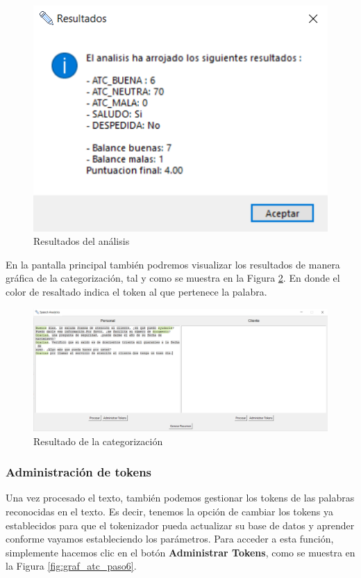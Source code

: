 \documentclass[twocolumn, fontsize=10pt]{article}
\begin{document}
\begin{figure}[h]
    \centering
    \includegraphics[width=\linewidth]{graficas/ATC_paso4.png}
    \caption{Resultados del análisis}
    \label{fig:graf_atc_paso4}
\end{figure}

En la pantalla principal también podremos visualizar los resultados de manera gráfica de la categorización, tal y como se muestra en la Figura \ref{fig:graf_atc_paso5}. En donde el color de resaltado indica el token al que pertenece la palabra.

\begin{figure}[h]
    \centering
    \includegraphics[width=\linewidth]{graficas/ATC_paso5.png}
    \caption{Resultado de la categorización}
    \label{fig:graf_atc_paso5}
\end{figure}

\subsubsection{Administración de tokens}
Una vez procesado el texto, también podemos gestionar los tokens de las palabras reconocidas en el texto. Es decir, tenemos la opción de cambiar los tokens ya establecidos para que el tokenizador pueda actualizar su base de datos y aprender conforme vayamos estableciendo los parámetros. Para acceder a esta función, simplemente hacemos clic en el botón \textbf{Administrar Tokens}, como se muestra en la Figura \ref{fig:graf_atc_paso6}.
\end{document}
